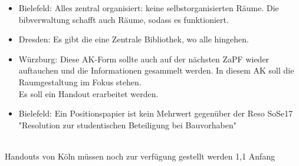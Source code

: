     \begin{itemize}
      \item Bielefeld: Alles zentral organisiert: keine selbstorganisierten Räume. Die bibverwaltung schafft auch Räume, sodass es funktioniert.

      \item Dresden: Es gibt die eine Zentrale Bibliothek, wo alle hingehen.

      \item Würzburg: Diese AK-Form sollte auch auf der nächsten ZaPF wieder auftauchen und die Informationen gesammelt werden.
      In diesem AK soll die Raumgestaltung im Fokus stehen. \\

      Es soll ein Handout erarbeitet werden.

      \item Bielefeld: Ein Positionspapier ist kein Mehrwert gegenüber der Reso SoSe17 "Resolution zur studentischen Beteiligung bei Bauvorhaben"

    \end{itemize} \\

   Handouts von Köln müssen noch zur verfügung gestellt werden
                                                                                                                               1,1        Anfang
